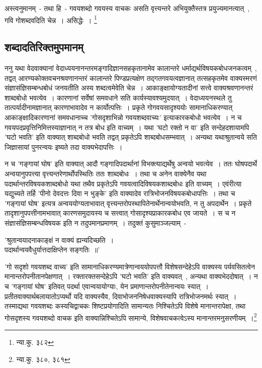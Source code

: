 		{\fontsize{11.7}{0}\selectfont\s अस्त्वनुमानम्~- तथा हि~- गवयशब्दो गवयस्य वाचकः असति वृत्त्यन्तरे अभियुक्तैस्तत्र प्रयुज्यमानत्वात्~, गवि गोशब्दवदिति चेन्न~। असिद्धेः~। \footnote{न्या.कु. ३८२}}

		\subsection{शब्दादतिरिक्तमुपमानम्}

		ननु यथा वेदवाक्यानां वेदाध्ययनानन्तरमङ्गादिज्ञानसहकृतानामेव कालान्तरे धर्माद्यर्थविषयकबोधजनकत्वम्~, तद्वत् आरण्यकोक्तवचनश्रवणानन्तरं कालान्तरे पिण्डप्रत्यक्षेण तद्गतगवयत्वज्ञानात् तत्सहकृतमेव वाक्यस्मरणं संज्ञासंज्ञिसम्बन्धबोधं जनयतीति अस्य शब्दत्वमेवेति चेन्न~। आकाङ्क्षायोग्यतादीनां सत्त्वे वाक्यश्रवणानन्तरं शाब्दबोधो भवत्येव~। कारणानां सर्वेषां समवधाने सति कार्यस्यावश्यमुदयात्~। वेदाध्ययनस्थले तु तात्पर्यादीनामज्ञानात् कारणाभावादेव न कार्योत्पत्तिः~। प्रकृते गोगवयसादृश्ययोः सामानाधिकरण्यात् आकाङ्क्षादिकारणानां समवधानाच्च 'गोसदृशाभिन्नो गवयशब्दवाच्यः' इत्याकारकबोधो भवत्येव~। न च गवयपदप्रवृत्तिनिमित्तस्याज्ञानात् न तत्र बोध इति वाच्यम्~। यथा 'घटो रक्तो न वा' इति सन्देहदशायामपि 'घटो भवति' इति वाक्यात् शाब्दबोधो भवति तद्वत् प्रकृतेऽपि शाब्दबोधसम्भवात्~। अन्यथा यथाश्रुतान्वये सति जिज्ञासायां पुनरन्वयः इष्यते तदा वाक्यभेदापत्तिः~।

		न च 'गङ्गायां घोष' इति वाक्यात् आदौ गङ्गादिपदार्थानां विभक्त्याद्यर्थेषु अन्वयो भवत्येव~। ततः घोषपदार्थे अन्वयानुपपत्त्या वृत्त्यन्तरेणार्थोपस्थितिः ततः शाब्दबोधः~। तथा च अनेन वाक्येनैव यथा पदार्थान्तरविषयकशाब्दबोधो यथा तथैव प्रकृतेऽपि गवयत्वादिविषयकशाब्दबोधः इति वाच्यम्~। एवंरीत्या यद्युच्यते तर्हि 'पीनो देवदत्तः दिवा न भुङ्के' इति वाक्यादेव रात्रिभोजनविषयकबोधापत्तिः~। तथा च 'गङ्गायां घोष' इत्यत्र अन्वययोग्यताभावात् वृत्त्यन्तरोपस्थापितेनार्थेनान्वयोभवति, न तु अपदार्थेन~। प्रकृते तादृशानुपपत्तीनामभावात् कारणसमुदायस्य च सत्त्वात् गोसादृश्यप्राकारकबोध एव जायते~। स च न संज्ञासंज्ञिसम्बन्धविषयक इति न तदुपमानप्रमाणम्~। तदुक्तं कुसुमाञ्जल्याम्~-

		{\fontsize{11.7}{0}\selectfont\s \begin{center}'श्रुतान्वयादनाकाङ्क्षं न वाक्यं ह्यन्यदिच्छति~।\\ पदार्थान्वयवैधुर्यात्तदाक्षिप्तेन सङ्गतिः~॥'\\\end{center} 'गो सदृशो गवयशब्द वाच्य' इति सामानाधिकरण्यमात्रेणान्वययोपपत्तौ विशेषसन्देहेऽपि वाक्यस्य पर्यवसितत्वेन मानान्तरोपनीतानपेक्षणात्~। रक्तारक्तसन्देहेऽपि 'घटो भवति' इति वाक्यवत्~, अन्यथा वाक्यभेददोषात्~। न च 'गङ्गायां घोष' इतिवत् पदर्था एवान्वयायोग्याः, येन प्रमाणान्तरोपनीतेनान्वयः स्यात्~। प्रतीतवाक्यार्थबलायातोऽप्यर्थो यदि वाक्यस्यैव, दिवाभोजननिषेधवाक्यस्यापि रात्रिभोजनमर्थः स्यात्~।तस्माद्यथा गवयशब्दः कस्यचिद्वाचकः शिष्टप्रयोगादिति सामान्यतः निश्चितेऽपि विशेषे मानान्तरापेक्षा, तथा गोसदृशस्य गवयशब्दो वाचक इति वाक्यान्निश्चितेऽपि सामान्ये, विशेषवाचकत्वेऽस्य मानान्तरमनुसरणीयम्~।\footnote{न्या.कु. ३८०, ३८१}}

